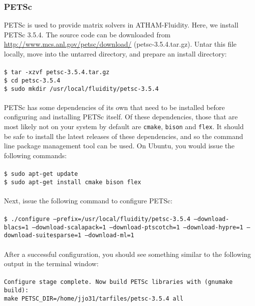 \documentclass[10pt,a4paper]{article}
\newcommand\tab[1][0.5cm]{\hspace*{#1}}
\begin{document}
\subsubsection{PETSc}
PETSc is used to provide matrix solvers in ATHAM-Fluidity. Here, we install PETSc 3.5.4. The source code can be downloaded from \url{http://www.mcs.anl.gov/petsc/download/} (petsc-3.5.4.tar.gz). Untar this file locally, move into the untarred directory, and prepare an install directory:\\\\
\tab \texttt{\$ tar -xzvf petsc-3.5.4.tar.gz}\\
\tab \texttt{\$ cd petsc-3.5.4}\\
\tab \texttt{\$ sudo mkdir /usr/local/fluidity/petsc-3.5.4}\\\\
PETSc has some dependencies of its own that need to be installed before configuring and installing PETSc itself. Of these dependencies, those that are most likely not on your system by default are \texttt{cmake}, \texttt{bison} and \texttt{flex}. It should be safe to install the latest releases of these dependencies, and so the command line package management tool can be used. On Ubuntu, you would issue the following commands:\\\\
\tab \texttt{\$ sudo apt-get update}\\
\tab \texttt{\$ sudo apt-get install cmake bison flex}\\\\
Next, issue the following command to configure PETSc:\\\\
\tab \texttt{\$ ./configure --prefix=/usr/local/fluidity/petsc-3.5.4  --download-blacs=1 --download-scalapack=1 --download-ptscotch=1  --download-hypre=1 --download-suitesparse=1 --download-ml=1 }\\\\
After a successful configuration, you should see something similar to the following output in the terminal window:\\\\
\tab \texttt{Configure stage complete. Now build PETSc libraries with (gnumake build):\\
\tab \tab make PETSC\_DIR=/home/jjo31/tarfiles/petsc-3.5.4  all}\\\\
\end{document}
